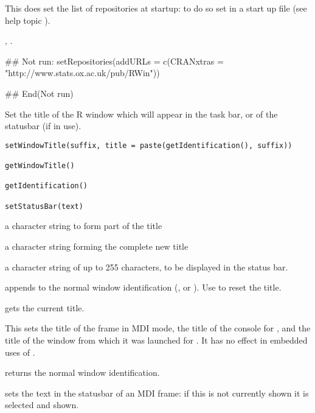 %
\begin{Note}\relax
This does  set the list of repositories at startup: to do
so set  in a start up file (see help topic
).
\end{Note}
%
\begin{SeeAlso}\relax
{}, .
\end{SeeAlso}
%
\begin{Examples}
\begin{ExampleCode}
## Not run: 
setRepositories(addURLs =
                c(CRANxtras = "http://www.stats.ox.ac.uk/pub/RWin"))

## End(Not run)
\end{ExampleCode}
\end{Examples}
%
\begin{Description}\relax
Set the title of the R window which will appear in the task bar, or of
the statusbar (if in use).
\end{Description}
%
\begin{Usage}
\begin{verbatim}
setWindowTitle(suffix, title = paste(getIdentification(), suffix))

getWindowTitle()

getIdentification()

setStatusBar(text)
\end{verbatim}
\end{Usage}
%
\begin{Arguments}
\begin{ldescription}
\item[\code{suffix}] a character string to form part of the title
\item[\code{title}] a character string forming the complete new title
\item[\code{text}] a character string of up to 255 characters, to be
displayed in the status bar.
\end{ldescription}
\end{Arguments}
%
\begin{Details}\relax
{} appends  to the normal window
identification (,  or ).  Use
 to reset the title.

 gets the current title.

This sets the title of the frame in MDI mode, the title of the console
for , and the title of the window from which it was
launched for .
It has no effect in embedded uses of \R{}.

 returns the normal window identification.

 sets the text in the statusbar of an MDI
frame: if this is not currently shown it is selected and shown.
\end{Details}
